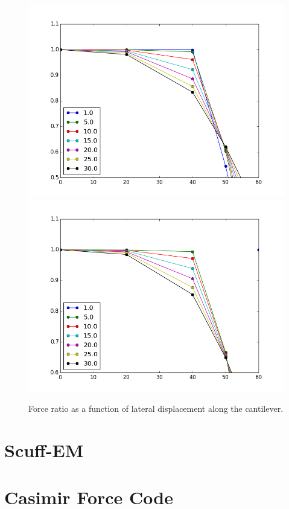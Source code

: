 \documentclass[11pt]{article}
\begin{document}
\begin{figure}[h]
\centering
\includegraphics[width=5in]{lateral_force_drop_zoom}
\includegraphics[width=5in]{lateral_force_drop_finite_zoom}
\caption{Force ratio as a function of lateral displacement along the cantilever.}\label{fig:latdropZoom}
\end{figure}

\pagebreak
\appendix
\section{Scuff-EM}
\section{Casimir Force Code}



\end{document}
